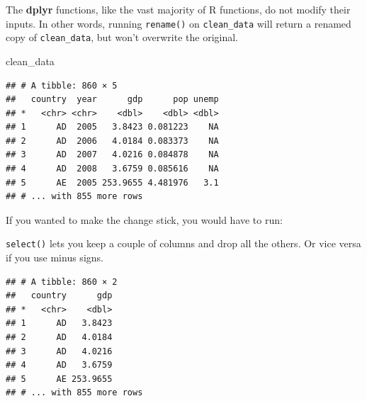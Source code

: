 \documentclass[12pt,oneside,openany]{tufte-book}
\newenvironment{Shaded}{}{}
\newcommand{\KeywordTok}[1]{\textcolor[rgb]{0.00,0.44,0.13}{\textbf{{#1}}}}
\newcommand{\DataTypeTok}[1]{\textcolor[rgb]{0.56,0.13,0.00}{{#1}}}
\newcommand{\StringTok}[1]{\textcolor[rgb]{0.25,0.44,0.63}{{#1}}}
\newcommand{\NormalTok}[1]{{#1}}
\begin{document}
The \textbf{dplyr} functions, like the vast majority of R functions, do
not modify their inputs. In other words, running \texttt{rename()} on
\texttt{clean\_data} will return a renamed copy of \texttt{clean\_data},
but won't overwrite the original.

\begin{Shaded}
\begin{Highlighting}[]
\NormalTok{clean_data}
\end{Highlighting}
\end{Shaded}

\begin{verbatim}
## # A tibble: 860 × 5
##   country  year      gdp      pop unemp
## *   <chr> <chr>    <dbl>    <dbl> <dbl>
## 1      AD  2005   3.8423 0.081223    NA
## 2      AD  2006   4.0184 0.083373    NA
## 3      AD  2007   4.0216 0.084878    NA
## 4      AD  2008   3.6759 0.085616    NA
## 5      AE  2005 253.9655 4.481976   3.1
## # ... with 855 more rows
\end{verbatim}

If you wanted to make the change stick, you would have to run:

\begin{Shaded}
\end{Shaded}

\texttt{select()} lets you keep a couple of columns and drop all the
others. Or vice versa if you use minus signs.

\begin{Shaded}
\end{Shaded}

\begin{verbatim}
## # A tibble: 860 × 2
##   country      gdp
## *   <chr>    <dbl>
## 1      AD   3.8423
## 2      AD   4.0184
## 3      AD   4.0216
## 4      AD   3.6759
## 5      AE 253.9655
## # ... with 855 more rows
\end{verbatim}

\begin{Shaded}
\end{Shaded}
\end{document}
